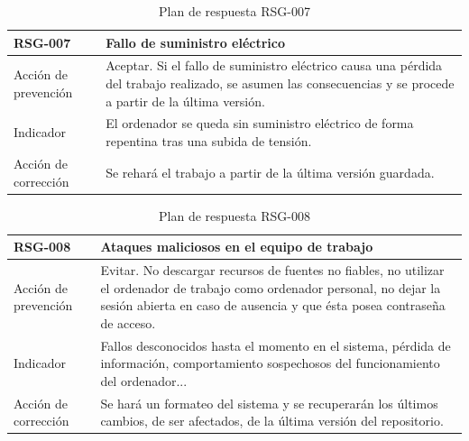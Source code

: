 \begin{table}[htpb]
\centering
\begin{tabularx}{\textwidth}{|l|X|}
\hline
RSG-007              & Fallo de suministro eléctrico                                                                                                                                 \\ \hline
Acción de prevención & Aceptar. Si el fallo de suministro eléctrico causa una pérdida del trabajo realizado, se asumen las consecuencias y se procede a partir de la última versión. \\ \hline
Indicador            & El ordenador se queda sin suministro eléctrico de forma repentina tras una subida de tensión.                                                                 \\ \hline
Acción de corrección & Se rehará el trabajo a partir de la última versión guardada.                                                                                                  \\ \hline
\end{tabularx}
\caption{Plan de respuesta RSG-007}
\end{table}


\begin{table}[htpb]
\centering
\begin{tabularx}{\textwidth}{|X|l|}
\hline
RSG-008              & Ataques maliciosos en el equipo de trabajo                                                                                                                                                              \\ \hline
Acción de prevención & Evitar. No descargar recursos de fuentes no fiables, no utilizar el ordenador de trabajo como ordenador personal, no dejar la sesión abierta en caso de ausencia y que ésta posea contraseña de acceso. \\ \hline
Indicador            & Fallos desconocidos hasta el momento en el sistema, pérdida de información, comportamiento sospechosos del funcionamiento del ordenador...                                                              \\ \hline
Acción de corrección & Se hará un formateo del sistema y se recuperarán los últimos cambios, de ser afectados, de la última versión del repositorio.                                                                           \\ \hline
\end{tabularx}
\caption{Plan de respuesta RSG-008}
\end{table}






